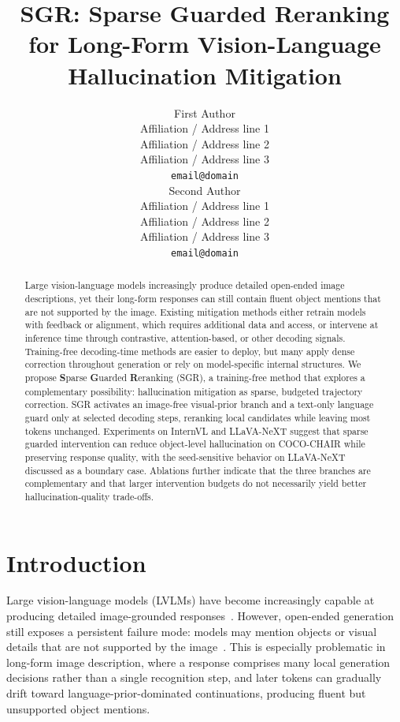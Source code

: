 \documentclass[11pt]{article}
\title{SGR: Sparse Guarded Reranking for Long-Form Vision-Language Hallucination Mitigation}
\author{First Author \\
  Affiliation / Address line 1 \\
  Affiliation / Address line 2 \\
  Affiliation / Address line 3 \\
  \texttt{email@domain} \\\And
  Second Author \\
  Affiliation / Address line 1 \\
  Affiliation / Address line 2 \\
  Affiliation / Address line 3 \\
  \texttt{email@domain} \\}
\begin{document}
\maketitle
\begin{abstract}
    Large vision-language models increasingly produce detailed open-ended image descriptions, yet their long-form responses can still contain fluent object mentions that are not supported by the image.
    Existing mitigation methods either retrain models with feedback or alignment, which requires additional data and access, or intervene at inference time through contrastive, attention-based, or
  other decoding signals.
    Training-free decoding-time methods are easier to deploy, but many apply dense correction throughout generation or rely on model-specific internal structures.
    We propose \textbf{S}parse \textbf{G}uarded \textbf{R}eranking (SGR), a training-free method that explores a complementary possibility: hallucination mitigation as sparse, budgeted trajectory
  correction.
    SGR activates an image-free visual-prior branch and a text-only language guard only at selected decoding steps, reranking local candidates while leaving most tokens unchanged.
    Experiments on InternVL and LLaVA-NeXT suggest that sparse guarded intervention can reduce object-level hallucination on COCO-CHAIR while preserving response quality, with the seed-sensitive behavior
  on LLaVA-NeXT discussed as a boundary case.
    Ablations further indicate that the three branches are complementary and that larger intervention budgets do not necessarily yield better hallucination-quality trade-offs.
  \end{abstract}

\section{Introduction}

  Large vision-language models (LVLMs) have become increasingly capable at producing detailed image-grounded responses~\citep{liu-etal-2023-visual-instruction,liu2024llavanext,wang2025internvl35advancingopensourcemultimodal,bai2025qwen3vltechnicalreport}.
  However, open-ended generation still exposes a persistent failure mode: models may mention objects or visual details that are not supported by the image~\citep{rohrbach-etal-2018-object,li-etal-2023-evaluating,sun-etal-2024-aligning,guan2023hallusionbench}.
  This is especially problematic in long-form image description, where a response comprises many local generation decisions rather than a single recognition step, and later tokens can gradually drift toward language-prior-dominated continuations, producing fluent but unsupported object mentions.
\end{document}
